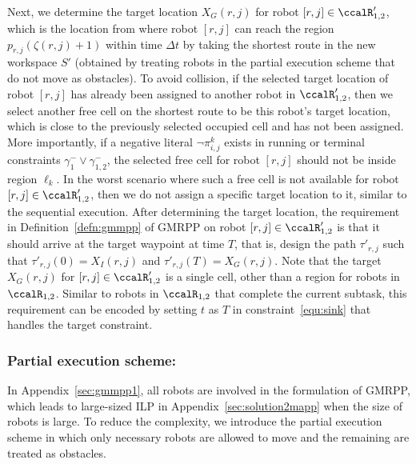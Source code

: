 \documentclass[Afour,sageh,times]{sagej}
\renewcommand{\ap}[3]{\mathcal{\pi}_{{#1},{#2}}^{#3}}
\begin{document}
{{ Next, we determine the target location $X_G(r,j)$ for robot $[r,j] \in \ccalR'_{1,2}$, which is the  location from where robot $[r,j]$ can reach the region $p_{r,j}(\zeta(r,j)+1)$ within time $\Delta t$ by taking the shortest route in the new workspace $S'$ (obtained by treating robots in the partial execution scheme that do not move as obstacles). To avoid collision, if the selected target location of robot $[r,j]$ has already been assigned to another robot in $\ccalR'_{1,2}$, then we select another free cell on the shortest route to be this robot's target location, which is close to the previously selected occupied cell and has not been assigned. More importantly, if a negative literal $\neg \ap{i}{j}{k}$ exists in running or terminal constraints $\gamma_1^- \vee \gamma_{1,2}^-$,  the selected free cell for robot $[r,j]$  should not be inside region $\ell_k$. In the worst scenario where such a free cell is not available for robot $[r,j]\in \ccalR_{1,2}'$, then we do not assign a specific target location to it, similar to the sequential execution. After determining the target location,  the requirement in Definition~\ref{defn:gmmpp} of GMRPP on robot $[r,j] \in \ccalR'_{1,2}$ is that it should arrive at the target waypoint at time $T$, that is, design the path $\tau'_{r,j}$ such that $\tau'_{r,j}(0) = X_I(r,j)$ and $\tau'_{r,j}(T)= X_G(r,j)$. Note that the target $X_G(r,j)$ for $[r,j] \in \ccalR_{1,2}'$ is a single cell, other than a region for robots in $\ccalR_{1,2}$.
 Similar to robots in $\ccalR_{1,2}$ that complete the current subtask, this requirement can be encoded by setting $t$ as $T$ in constraint~\eqref{equ:sink} that handles the target constraint.

 \subsubsection{Partial execution scheme:}\label{sec:extension_partial}
 In Appendix~\ref{sec:gmmpp1}, all robots are involved in the formulation of GMRPP, which leads to large-sized ILP in Appendix~\ref{sec:solution2mapp} when the size of robots is large.  To reduce the complexity, we introduce the partial execution scheme in which only necessary robots are allowed to move and the remaining are treated as obstacles.

}}
\end{document}
